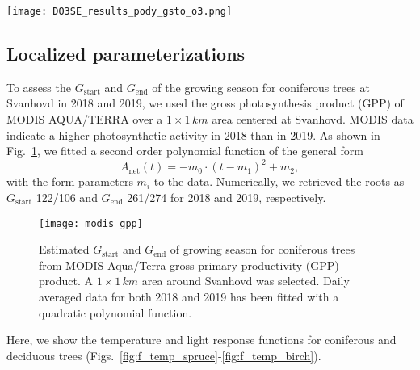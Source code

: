 \documentclass[bg, manuscript]{copernicus}
\begin{document}
\begin{figure*}[t]
  \texttt{[image: DO3SE\_results\_pody\_gsto\_o3.png]}
  \caption{$\mathrm{DO_3SE}$ modeling results for mapping manual default parameterization. $\mathrm{POD_y}$ is shown over \unit{doy}, March--October. A flux threshold $y=1\,\unit{nmol\,m^{-2}\,s^{-1}}$ per projected leaf area (PLA) has been chosen.  are plotted on the same axis and scales as $G_\text{sto}^\text{leaf}$ but in units of $\unit{ppb}$. (a, b) deciduous tree; (c, d) coniferous tree; (e, f) perennial grassland. From left to right: 2018, 2019.}
  \label{fig:pody_mm_composit}
\end{figure*}

\subsection{Localized parameterizations}

To assess the $G_\mathrm{start}$  and $G_\mathrm{end}$ of the growing season for coniferous trees at Svanhovd in 2018 and 2019, we used the gross photosynthesis product (GPP) of MODIS AQUA/TERRA over a $1\times 1\,\unit{km}$ area centered at Svanhovd. MODIS data indicate a higher photosynthetic activity in 2018 than in 2019. As shown in Fig.~\ref{fig:modis_gpp}, we fitted a second order polynomial function of the general form
%
\begin{equation}
A_\mathrm{net}(t) =  -m_0\cdot(t-m_1)^2+m_2,
\end{equation}
%
with the form parameters $m_i$ to the data. Numerically, we retrieved the roots as $G_\mathrm{start}$ 122/106 and $G_\mathrm{end}$ 261/274 for 2018 and 2019, respectively. 

\begin{figure}[th]
  \texttt{[image: modis\_gpp]}
  \caption{Estimated $G_\mathrm{start}$ and $G_\mathrm{end}$ of growing season for coniferous trees from MODIS Aqua/Terra gross primary productivity (GPP) product. A $1\times 1\,\unit{km}$ area around Svanhovd was selected. Daily averaged data for both 2018 and 2019 has been fitted with a quadratic polynomial function.}
  \label{fig:modis_gpp}
\end{figure}

Here, we show the temperature and light response functions for coniferous and deciduous trees (Figs.~\ref{fig:f_temp_spruce}-\ref{fig:f_temp_birch}). 
\end{document}
